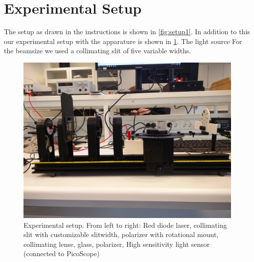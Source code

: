 \section{Experimental Setup}
The setup as drawn in the instructions is shown in \cref{fig:setup1}. In addition to this our experimental setup with the apparature is shown in \cref{fig:setup}. 
The light source For the beamsize we used a collimating slit of five variable widths.

\begin{figure}[h]
    \centering
    \includegraphics[trim={0 25cm 0 20cm}, clip, width=\columnwidth]{setup}
\caption{Experimental setup. From left to right: Red diode laser, collimating slit with customizable slitwidth, polarizer with rotational mount, collimating lense, glass, polarizer, High sensitivity light sensor (connected to PicoScope)}
    \label{fig:setup}
\end{figure}

